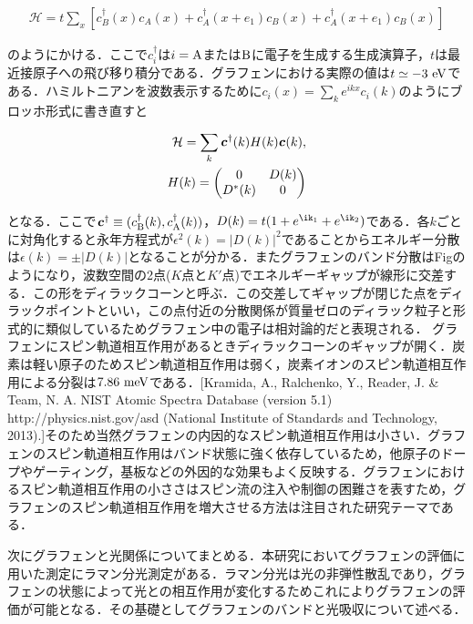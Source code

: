 \begin{eqnarray}
\mathcal{H} = t\sum_{x}[c_{B}^{\dag}(x)c_{A}(x) + c_{A}^{\dag}(x+e_{1})c_{B}(x) + c_{A}^{\dag}(x+e_{1})c_{B}(x)]
\label{eq:tight-binding}
\end{eqnarray}

のようにかける．ここで$c_{i}^{\dag}$は$i=\rm A$または$\rm B$に電子を生成する生成演算子，$t$は最近接原子への飛び移り積分である．グラフェンにおける実際の値は$t \simeq -3\rm\ eV$である．ハミルトニアンを波数表示するために$c_{i}(x)=\sum_{k}e^{ikx}c_{i}(k)$のようにブロッホ形式に書き直すと

\begin{eqnarray}
\mathcal{H} = \sum_{k}\textbf{\textsl{c}}^{\dag}(k)H(k)\textbf{\textsl{c}}(k),\\
H(k) = 
\begin{pmatrix}
0 & D(k) \\ 
D^{*}(k) & 0  
\end{pmatrix}
\label{eq:tight-binding2}
\end{eqnarray}

となる．ここで$\textbf{\textsl{c}}^{\dag}\equiv(c_{\rm B}^{\dag}(k),c_{\rm A}^{\dag}(k))$，$D(k)=t(1 + e^{\ik_{1}}+e^{\ik_{2}})$である．各$k$ごとに対角化すると永年方程式が$\epsilon^{2}(k)=|D(k)|^{2}$であることからエネルギー分散は$\epsilon(k)=\pm|D(k)|$となることが分かる．またグラフェンのバンド分散はFigのようになり，波数空間の2点($K$点と$K'$点)でエネルギーギャップが線形に交差する．この形をディラックコーンと呼ぶ．この交差してギャップが閉じた点をディラックポイントといい，この点付近の分散関係が質量ゼロのディラック粒子と形式的に類似しているためグラフェン中の電子は相対論的だと表現される．
グラフェンにスピン軌道相互作用があるときディラックコーンのギャップが開く．炭素は軽い原子のためスピン軌道相互作用は弱く，炭素イオンのスピン軌道相互作用による分裂は$7.86\rm\ meV$である．[Kramida, A., Ralchenko, Y., Reader, J. & Team, N. A. NIST Atomic Spectra Database (version 5.1) http://physics.nist.gov/asd (National Institute of Standards and Technology, 2013).]そのため当然グラフェンの内因的なスピン軌道相互作用は小さい．グラフェンのスピン軌道相互作用はバンド状態に強く依存しているため，他原子のドープやゲーティング，基板などの外因的な効果もよく反映する．グラフェンにおけるスピン軌道相互作用の小ささはスピン流の注入や制御の困難さを表すため，グラフェンのスピン軌道相互作用を増大させる方法は注目された研究テーマである．

次にグラフェンと光関係についてまとめる．本研究においてグラフェンの評価に用いた測定にラマン分光測定がある．ラマン分光は光の非弾性散乱であり，グラフェンの状態によって光との相互作用が変化するためこれによりグラフェンの評価が可能となる．その基礎としてグラフェンのバンドと光吸収について述べる．

